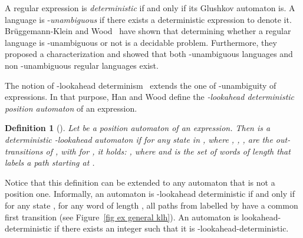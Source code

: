 \documentclass[11pt]{elsarticle}
\newtheorem{definition}{Definition}
\newcommand\modif[2]{{#2}}
\begin{document}
A regular expression  is \emph{deterministic} if and only if its Glushkov automaton is. A language is  -\emph{unambiguous} if there exists a deterministic expression to denote it. Br\"uggemann-Klein and Wood~\cite{BW98} have shown that determining whether a regular language is -unambiguous or not is a decidable problem. Furthermore, they proposed a characterization and showed that both -unambiguous languages and non -unambiguous regular languages exist.

The notion of -lookahead determinism~\cite{HW08} extends the one of -unambi\-guity of expressions. In that purpose, Han and Wood define the \emph{-lookahead deterministic position automaton} of an expression.

\begin{definition}[\cite{HW08}]\label{def kla}
  Let  be a position automaton of an expression. Then  is a \emph{deterministic} \emph{-lookahead automaton} if for any state  in , where , , ,  are the out-transitions of , with  for , it holds: , where  and  is the set of words of length  that labels a path starting at .
\end{definition}

Notice that this definition can be extended to any automaton that is not a position one.
Informally, an automaton is -lookahead deterministic if and only if for any state , for any word  of length , all  paths from  labelled by  have a common first transition  (see Figure~\ref{fig ex general klh}).
\modif{}{An automaton is lookahead-deterministic if there exists an integer  such that it is -lookahead-deterministic.}
\end{document}
